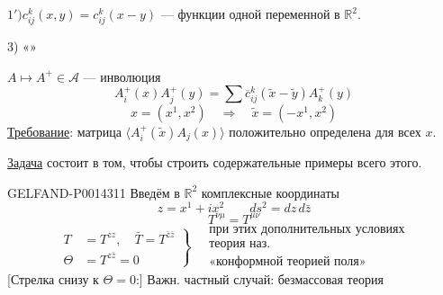 \(1')\)\quad \(c_{ij}^k(x,y)=c_{ij}^k(x-y)\) — функции одной переменной в \(\mathbb R^2\).

3) «»

\(A\mapsto A^+\in\mathcal A\) — инволюция
\begin{equation*}
\tag{8}
A_i^+(x)A_j^+(y)=\sum\overline c_{ij}^k(\widetilde x-\widetilde y)A_k^+(y)
\end{equation*}
\[
x=(x^1,x^2)\quad\Rightarrow\quad\widetilde x=(-x^1,x^2)
\]
\uline{Требование}: матрица \(\langle A_i^+(\widetilde x)A_j(x)\rangle\)
положительно определена для всех \(x\).

\uline{Задача} состоит в том, чтобы строить содержательные примеры всего этого.


\begin{GelfandAdjacentEvidence}{GELFAND-P001431}{1}
Введём в \(\mathbb R^2\) комплексные координаты
\[
z=x^1+ix^2\qquad ds^2=dz\,d\bar z
\]
\begin{equation*}
\tag{9}
T^{\nu\mu}=T^{\mu\nu}
\end{equation*}
\begin{equation*}
\tag{10}
\left.\begin{aligned}
T&=T^{zz},\quad \bar T=T^{\bar z\bar z}\\
\Theta&=T^{z\bar z}=0
\end{aligned}\right\}\quad
\begin{gathered}
\text{при этих дополнительных условиях}\\
\text{теория наз.}\\
\text{«конформной теорией поля»}
\end{gathered}
\end{equation*}
[Стрелка снизу к \(\Theta=0\):] Важн. частный случай: безмассовая теория
\end{GelfandAdjacentEvidence}
